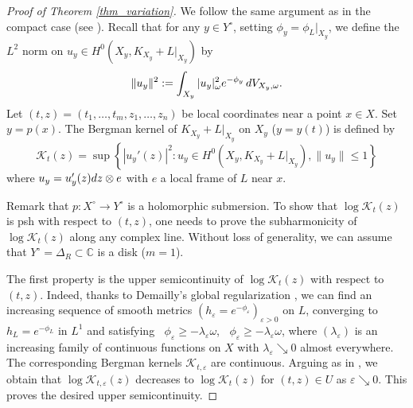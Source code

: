 \documentclass[a4paper, 11pt]{amsart}
\theoremstyle{plain}
\numberwithin{equation}{section} %
\numberwithin{figure}{section} %
\theoremstyle{plain}
\theoremstyle{plain}
\theoremstyle{plain}
\theoremstyle{plain}
\theoremstyle{remark}
\theoremstyle{definition}
\theoremstyle{definition}
\newcommand{\K}{\mathcal{K}}
\DeclareMathOperator \ddc{\textrm{dd}^c}
\begin{document}
 \begin{proof}[Proof of Theorem \ref{thm_variation}]
 We follow the same argument as in the compact case (see \cite{Berndtsson_Paun_08, Paun_Takayama_2018,Zhou_Zhu_L_2_jdg}).
 Recall that for any $y\in Y^\circ$, setting $\phi_y=\phi_L|_{X_y}$,
 we define the $L^2$ norm on $u_y\in H^0(X_y,K_{X_y}+ L|_{X_y})$ by 
 \[\|u_y\|^2:=\int_{X_y} |u_y|^2_\omega e^{-\phi_y} \,{\rm d}V_{X_y,\omega}. \]
Let $(t,z)=(t_1,\ldots,t_m,z_1,\ldots,z_n)$ be local coordinates near a point $x\in X$. Set $y=p(x)$. 
 The Bergman kernel of $K_{X_y}+L|_{X_y}$ on $X_y$ ($y=y(t)$) is defined by
     \begin{equation}\label{eq: Bergman-Kernel}
       \K_{t}(z)=\sup \left\{|u_y'(z)|^2: u_y\in H^0(X_y,K_{X_y}+ L|_{X_y}),\|u_y\| \leq 1 \right\} 
     \end{equation}
     where $u_y=u'_y(z){\rm d}z\otimes e$ with $e$ a local frame of $L$ near $x$.

     Remark that  $p:X^\circ \to Y^\circ$ is a holomorphic submersion. 
     To show that $\log\K_t(z)$ is psh with respect to $(t,z)$, one needs to prove the subharmonicity of $\log\K_t(z)$ along any complex line. Without loss of generality, we can assume that $Y^\circ=\Delta_R\subset\mathbb{C}$ is a disk ($m=1$).  %

\smallskip
The first property is the upper semicontinuity of $\log \K_t(z)$ with respect to $(t,z)$.
Indeed, thanks to Demailly's global regularization \cite[Section 9]{demailly82-estimations}, we can find an increasing sequence of smooth metrics $(h_\varepsilon = e^{-\phi_\varepsilon})_{\varepsilon>0}$ on $L$, converging to $h_L = e^{-\phi_L}$ in $L^1$ and satisfying
$\ddc\phi_\varepsilon\geq -\lambda_\varepsilon \omega$, $\ddc \phi_\varepsilon \ge -\lambda_\varepsilon \omega$, where $(\lambda_\varepsilon)$ is an increasing family of continuous functions on $X$ with $\lambda_\varepsilon \searrow 0$ almost everywhere. The corresponding Bergman kernels $\K_{t,\varepsilon}$ are continuous. Arguing as in \cite[Theorem~1.1]{Paun_Takayama_2018}, we obtain that $\log \K_{t,\varepsilon}(z)$ decreases to $\log \K_t(z)$ for $(t,z)\in U$ as $\varepsilon \searrow 0$. This proves the desired upper semicontinuity.


\end{proof}
\end{document}
